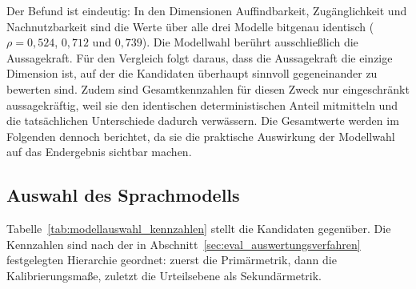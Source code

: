 Der Befund ist eindeutig: In den Dimensionen Auffindbarkeit, Zugänglichkeit und
Nachnutzbarkeit sind die Werte über alle drei Modelle bitgenau identisch
($\rho = 0{,}524$, $0{,}712$ und $0{,}739$). Die Modellwahl berührt ausschließlich die
Aussagekraft. Für den Vergleich folgt daraus, dass die Aussagekraft die
einzige Dimension ist, auf der die Kandidaten überhaupt sinnvoll gegeneinander zu bewerten
sind. Zudem sind Gesamtkennzahlen für diesen Zweck nur eingeschränkt aussagekräftig,
weil sie den identischen deterministischen Anteil mitmitteln und die tatsächlichen
Unterschiede dadurch verwässern. Die Gesamtwerte werden im Folgenden dennoch berichtet,
da sie die praktische Auswirkung der Modellwahl auf das Endergebnis sichtbar machen.

\subsection{Auswahl des Sprachmodells}
\label{subsec:eval_modellauswahl_auswahl}

Tabelle~\ref{tab:modellauswahl_kennzahlen} stellt die Kandidaten gegenüber. Die
Kennzahlen sind nach der in Abschnitt~\ref{sec:eval_auswertungsverfahren} festgelegten Hierarchie geordnet: zuerst die
Primärmetrik, dann die Kalibrierungsmaße, zuletzt die Urteilsebene als Sekundärmetrik.

